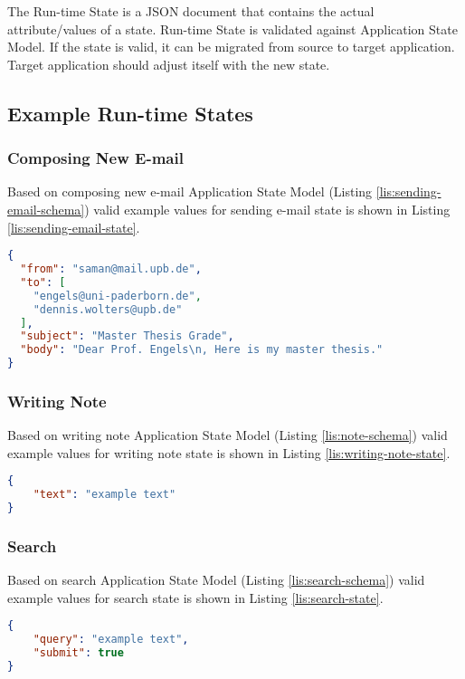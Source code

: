 The Run-time State is a JSON document that contains the actual attribute/values of a state. Run-time State is validated against Application State Model. If the state is valid, it can be migrated from source to target application.
Target application should adjust itself with the new state.

\subsection{Example Run-time States}

\subsubsection{Composing New E-mail}
Based on composing new e-mail Application State Model (Listing \ref{lis:sending-email-schema}) valid example values for sending e-mail state is shown in Listing \ref{lis:sending-email-state}.

\lstset{
  label=lis:sending-email-state, caption=A Run-time State for sending e-mail as JSON document., 
}
\begin{lstlisting}[language=json]
{
  "from": "saman@mail.upb.de",
  "to": [
    "engels@uni-paderborn.de",
    "dennis.wolters@upb.de"
  ],
  "subject": "Master Thesis Grade",
  "body": "Dear Prof. Engels\n, Here is my master thesis."
}
\end{lstlisting}


\subsubsection{Writing Note}
Based on writing note Application State Model (Listing \ref{lis:note-schema}) valid example values for writing note state is shown in Listing \ref{lis:writing-note-state}.
 
\lstset{
  label=lis:writing-note-state, caption=A Run-time State for writing note as JSON document.
}
\begin{lstlisting}[language=json]
{
    "text": "example text"
}
\end{lstlisting}

\subsubsection{Search}
Based on search Application State Model (Listing \ref{lis:search-schema}) valid example values for search state is shown in Listing \ref{lis:search-state}.
\lstset{
  label=lis:search-state, caption=A Run-time State for search as JSON document.
}
\begin{lstlisting}[language=json]
{
    "query": "example text",
    "submit": true
}
\end{lstlisting}